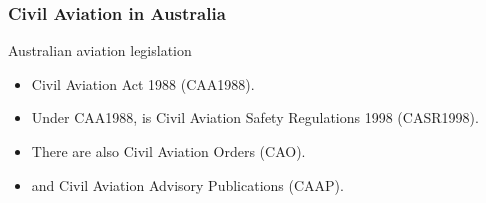 \begin{frame}
\frametitle{Civil Aviation in Australia}
\begin{block}{Australian aviation legislation}
\begin{itemize}
\item<1-> Civil Aviation Act 1988 (CAA1988).
\item<2-> Under CAA1988, is Civil Aviation Safety Regulations 1998 (CASR1998).
\item<3-> There are also Civil Aviation Orders (CAO).
\item<4-> and Civil Aviation Advisory Publications (CAAP).
\end{itemize}
\end{block}
\end{frame}
